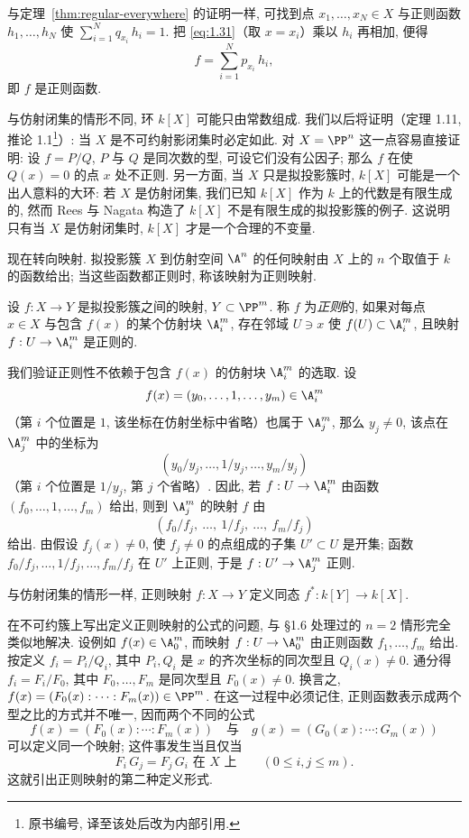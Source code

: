 与定理~\ref{thm:regular-everywhere} 的证明一样, 可找到点 $x_1, \ldots, x_N \in X$ 与正则函数 $h_1, \ldots, h_N$ 使 $\sum_{i=1}^N q_{x_i}\, h_i = 1$. 把 \eqref{eq:1.31}（取 $x = x_i$）乘以 $h_i$ 再相加, 便得
\[
	f = \sum_{i=1}^N p_{x_i}\, h_i,
\]
即 $f$ 是正则函数.

与仿射闭集的情形不同, 环 $k[X]$ 可能只由常数组成. 我们以后将证明（定理 1.11, 推论 1.1\footnote{原书编号, 译至该处后改为内部引用.}）: 当 $X$ 是不可约射影闭集时必定如此. 对 $X = \PP^n$ 这一点容易直接证明: 设 $f = P/Q$, $P$ 与 $Q$ 是同次数的型, 可设它们没有公因子; 那么 $f$ 在使 $Q(x) = 0$ 的点 $x$ 处不正则. 另一方面, 当 $X$ 只是拟投影簇时, $k[X]$ 可能是一个出人意料的大环: 若 $X$ 是仿射闭集, 我们已知 $k[X]$ 作为 $k$ 上的代数是有限生成的, 然而 Rees 与 Nagata 构造了 $k[X]$ 不是有限生成的拟投影簇的例子. 这说明只有当 $X$ 是仿射闭集时, $k[X]$ 才是一个合理的不变量.

现在转向映射. 拟投影簇 $X$ 到仿射空间 $\A^n$ 的任何映射由 $X$ 上的 $n$ 个取值于 $k$ 的函数给出; 当这些函数都正则时, 称该映射为正则映射.

\begin{definition}[拟投影簇间的正则映射]\label{def:regular-map-quasi}
	设 $f: X \to Y$ 是拟投影簇之间的映射, $Y \subset \PP^m$. 称 $f$ 为\emph{正则}的, 如果对每点 $x \in X$ 与包含 $f(x)$ 的某个仿射块 $\A^m_i$, 存在邻域 $U \ni x$ 使 $f(U) \subset \A^m_i$, 且映射 $f: U \to \A^m_i$ 是正则的.
\end{definition}

我们验证正则性不依赖于包含 $f(x)$ 的仿射块 $\A^m_i$ 的选取. 设
\[
	f(x) = (y_0, \ldots, 1, \ldots, y_m) \in \A^m_i
\]
（第 $i$ 个位置是 $1$, 该坐标在仿射坐标中省略）也属于 $\A^m_j$, 那么 $y_j \ne 0$, 该点在 $\A^m_j$ 中的坐标为
\[
	(y_0/y_j, \ldots, 1/y_j, \ldots, y_m/y_j)
\]
（第 $i$ 个位置是 $1/y_j$, 第 $j$ 个省略）. 因此, 若 $f: U \to \A^m_i$ 由函数 $(f_0, \ldots, 1, \ldots, f_m)$ 给出, 则到 $\A^m_j$ 的映射 $f$ 由
\[
	(f_0 / f_j, \ \ldots, \ 1/f_j, \ \ldots, \ f_m / f_j)
\]
给出. 由假设 $f_j(x) \ne 0$, 使 $f_j \ne 0$ 的点组成的子集 $U' \subset U$ 是开集; 函数 $f_0/f_j, \ldots, 1/f_j, \ldots, f_m/f_j$ 在 $U'$ 上正则, 于是 $f: U' \to \A^m_j$ 正则.

与仿射闭集的情形一样, 正则映射 $f: X \to Y$ 定义同态 $f^*: k[Y] \to k[X]$.

在不可约簇上写出定义正则映射的公式的问题, 与 §1.6 处理过的 $n = 2$ 情形完全类似地解决. 设例如 $f(x) \in \A^m_0$, 而映射 $f: U \to \A^m_0$ 由正则函数 $f_1, \ldots, f_m$ 给出. 按定义 $f_i = P_i/Q_i$, 其中 $P_i, Q_i$ 是 $x$ 的齐次坐标的同次型且 $Q_i(x) \ne 0$. 通分得 $f_i = F_i/F_0$, 其中 $F_0, \ldots, F_m$ 是同次型且 $F_0(x) \ne 0$. 换言之, $f(x) = (F_0(x) : \cdots : F_m(x)) \in \PP^m$. 在这一过程中必须记住, 正则函数表示成两个型之比的方式并不唯一, 因而两个不同的公式
\begin{equation}
	\label{eq:1.32}
	f(x) = (F_0(x) : \cdots : F_m(x)) \quad\text{与}\quad g(x) = (G_0(x) : \cdots : G_m(x))
\end{equation}
可以定义同一个映射; 这件事发生当且仅当
\begin{equation}
	\label{eq:1.33}
	F_i\, G_j = F_j\, G_i \text{ 在 } X \text{ 上} \qquad (0 \le i, j \le m).
\end{equation}
这就引出正则映射的第二种定义形式.

